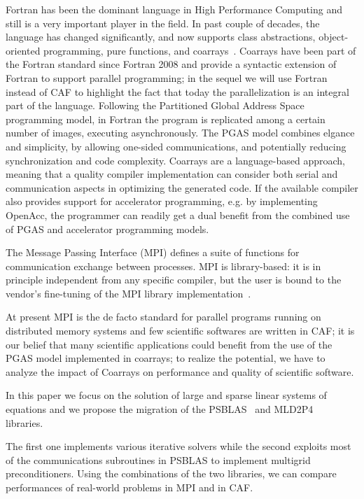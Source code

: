 \documentclass{IOS-Book-Article}
\begin{document}
Fortran has been the dominant language in High Performance
Computing and still is a very important player in the field. In past
couple of decades, the language has changed significantly,  and now 
supports class abstractions, object-oriented programming, pure
functions, and coarrays~\cite{Metcalf:2011:MFE}.  
Coarrays have been part of the Fortran standard since
Fortran 2008 and provide a syntactic extension of Fortran to
support parallel programming; in the sequel we will use Fortran
instead of CAF to highlight the fact that today the parallelization is
an integral part of the language.
Following the  Partitioned Global Address Space programming model,
in Fortran the program is replicated among a certain number of images,
executing asynchronously. 
The PGAS model combines elgance  and simplicity, by allowing one-sided
communications, and potentially reducing synchronization and code 
complexity. 
Coarrays are  a language-based approach, meaning that a quality
compiler implementation can consider both serial and communication
aspects in optimizing the generated code.
If the available  compiler also provides support for accelerator
programming, e.g. by implementing OpenAcc, the programmer can readily
get a dual benefit from the combined use of PGAS and accelerator
programming models. 


The Message Passing Interface (MPI) defines a suite of functions for
communication exchange between processes. MPI  is
library-based:  it is in principle independent from any specific
compiler, but the user  is bound to the vendor's fine-tuning of the
MPI library implementation~\cite{Garain:2015}.

At present  MPI is the de facto standard for parallel programs running
on distributed memory systems and few scientific softwares are written in
CAF; it is our belief that many scientific applications could
benefit from the use of the PGAS model implemented in coarrays; to
realize the potential, we have to analyze the impact of 
 Coarrays  on performance and quality of scientific software.

In this paper we focus on the solution of large and sparse linear
systems of equations and we propose the migration of the
PSBLAS~\cite{PSBLAS} and MLD2P4~\cite{mld-toms} libraries.

The first one implements various iterative solvers while the second
exploits most of the communications subroutines in PSBLAS to implement
multigrid preconditioners. Using the combinations of the two
libraries, we can compare performances of real-world problems in MPI
and in CAF.
\end{document}
